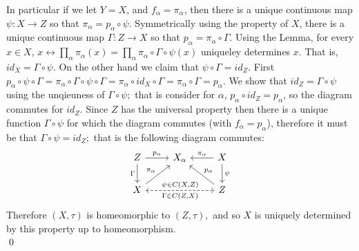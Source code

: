 \documentclass[11pt]{amsart}
\theoremstyle{definition}
\numberwithin{theorem}{section}
\numberwithin{definition}{section}
\numberwithin{equation}{section}
\begin{document}
	In particular if we let $Y = X$, and $f_\alpha = \pi_\alpha$, then there is a unique continuous map $\psi: X \to Z$ so that $\pi_{\alpha} =p_\alpha\circ\psi$. Symmetrically using the property of $X$, there is a unique continuous map $\Gamma: Z \to X$ so that $p_\alpha = \pi_\alpha \circ \Gamma$. Using the Lemma, for every $x\in X$, $x \leftrightarrow \prod_\alpha \pi_{\alpha}(x) = \prod_\alpha \pi_{\alpha} \circ \Gamma \circ \psi(x)$ uniqueley determines $x.$ That is, $id_X = \Gamma \circ \psi.$  On the other hand we claim that $\psi \circ \Gamma = id_Z.$ First $p_\alpha \circ \psi \circ \Gamma = \pi_\alpha \circ \Gamma \circ \psi \circ \Gamma  = \pi_\alpha \circ id_X \circ \Gamma = \pi_\alpha \circ \Gamma = p_\alpha$. We show that $id_Z = \Gamma \circ \psi$ using the unqieuness of $\Gamma \circ \psi;$ that is consider for $\alpha$, $p_\alpha \circ id_Z = p_\alpha$, so the diagram commutes for $id_Z$. Since $Z$ has the universal property then there is a unique function $\Gamma \circ \psi$ for which the diagram commutes (with $f_\alpha = p_\alpha$), therefore it must be that $\Gamma \circ \psi = id_Z;$ that is the following diagram commutes:
	\begin{equation*}
	\begin{tikzcd}
		Z \arrow{r}{p_\alpha}\arrow[swap]{d}{\Gamma} &X_\alpha& X\arrow[swap]{l}{\pi_\alpha} \arrow{d}{\psi}\\
		X\arrow{ru}{\pi_\alpha}  \arrow[dashed, <->]{rr}{\psi \in C(X,Z)}[swap]{\Gamma \in C(Z,X)}&  & Z \arrow[swap]{lu}{p_\alpha}
	\end{tikzcd}
\end{equation*}
	 Therefore $(X, \tau)$ is homeomorphic to $(Z, \tau),$ and so $X$ is uniquely determined by this property up to homeomorphism.\\
\qed
\end{document}

